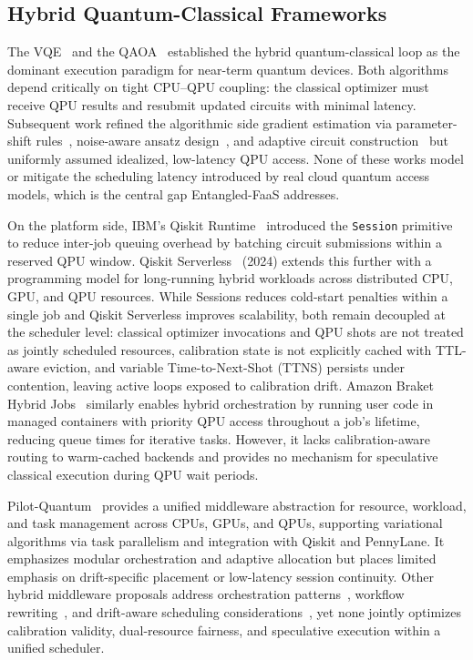 \documentclass[conference]{IEEEtran}
\begin{document}
\subsection{Hybrid Quantum-Classical Frameworks}
\label{subsec:related_hybrid}

The VQE~\cite{peruzzo2014vqe} and the QAOA~\cite{farhi2014qaoa} established the hybrid quantum-classical
loop as the dominant execution paradigm for near-term quantum devices.
Both algorithms depend critically on tight CPU--QPU coupling: the classical optimizer must receive QPU results and resubmit updated
circuits with minimal latency. Subsequent work refined the algorithmic
side gradient estimation via parameter-shift
rules~\cite{mitarai2018quantum}, noise-aware ansatz
design~\cite{kandala2017hardware}, and adaptive circuit
construction~\cite{grimsley2019adaptive} but uniformly assumed
idealized, low-latency QPU access. None of these works model or
mitigate the scheduling latency introduced by real cloud quantum access
models, which is the central gap Entangled-FaaS addresses.

On the platform side, IBM's Qiskit Runtime~\cite{qiskit_runtime_2022} introduced the \texttt{Session} primitive to reduce inter-job queuing overhead by batching circuit submissions within a reserved QPU window.
Qiskit Serverless~\cite{qiskit_serverless_2024} (2024) extends this further with a programming model for long-running hybrid workloads
across distributed CPU, GPU, and QPU resources. While Sessions reduces cold-start penalties within a single job and Qiskit Serverless improves scalability, both remain decoupled at the scheduler level: classical optimizer invocations and QPU shots are not treated as jointly scheduled resources, calibration state is not explicitly cached with TTL-aware eviction, and variable Time-to-Next-Shot (TTNS) persists under contention, leaving active loops exposed to calibration drift. Amazon Braket Hybrid Jobs~\cite{braket_hybrid_2021} similarly enables hybrid orchestration by running user code in managed containers with priority QPU access throughout a job's lifetime, reducing queue times for iterative tasks. However, it lacks calibration-aware routing to warm-cached backends and provides no mechanism for speculative classical execution during QPU wait periods.

Pilot-Quantum~\cite{mantha_pilot_quantum_2024} provides a unified
middleware abstraction for resource, workload, and task management
across CPUs, GPUs, and QPUs, supporting variational algorithms via task
parallelism and integration with Qiskit and PennyLane. It emphasizes
modular orchestration and adaptive allocation but places limited
emphasis on drift-specific placement or low-latency session continuity.
Other hybrid middleware proposals address orchestration
patterns~\cite{faro_middleware_quantum_2023}, workflow
rewriting~\cite{weder_analysis_rewrite_2022}, and drift-aware
scheduling considerations~\cite{resch_accelerating_vqa_2021}, yet none
jointly optimizes calibration validity, dual-resource fairness, and
speculative execution within a unified scheduler.
\end{document}
